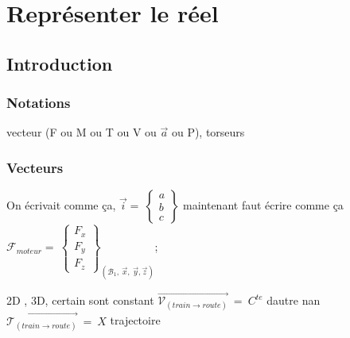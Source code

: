 \documentclass[
	11pt, %
	fleqn, %
	a4paper, %
]{LegrandOrangeBook}
\begin{document}

\chapterspaceabove{6.25cm} %
\chapterspacebelow{7.5cm} %

\chapter{Représenter le réel}

\section{Introduction}









\subsection{Notations}
vecteur (F ou M ou T ou V ou $\Vec{a}$ ou P), torseurs
\subsection{Vecteurs}\label{Vecteurs}

On écrivait comme ça,  $\Vec{i}=\ \begin{Bmatrix} a\\ b \\ c \end{Bmatrix} $  maintenant faut écrire comme ça 
 {$\mathcal{F}_{moteur} =\ \begin{Bmatrix}
F_{x}\\
F_{y}\\
F_{z}
\end{Bmatrix}_{( \mathcal{B}_{1} ,\ \vec{x} ,\ \vec{y} ,\vec{z})}$};

2D , 3D, certain sont constant $\overrightarrow{\mathcal{V}_{(train\rightarrow route)}} \ =\ C^{te}$ dautre nan $\overrightarrow{\mathcal{T}_{(train\rightarrow route)}} \ =\ X$ trajectoire
\end{document}

